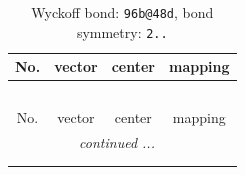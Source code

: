 \documentclass[fleqn,8pt]{jsarticle}
\begin{document}
\renewcommand{\arraystretch}{1.2}
\begin{longtable}{cccc}
\caption{Wyckoff bond: {\tt 96b@48d}, bond symmetry: {\tt 2..}}
 \\
 \hline \hline
No. & vector & center & mapping \\ \hline \endfirsthead

\multicolumn{3}{l}{\tablename\ \thetable{}} \\
 \hline \hline
No. & vector & center & mapping \\ \hline \endhead

 \hline \hline
\multicolumn{3}{r}{\footnotesize\it continued ...} \\ \endfoot

 \hline \hline
\multicolumn{3}{r}{} \\ \endlastfoot


\end{longtable}
\end{document}
